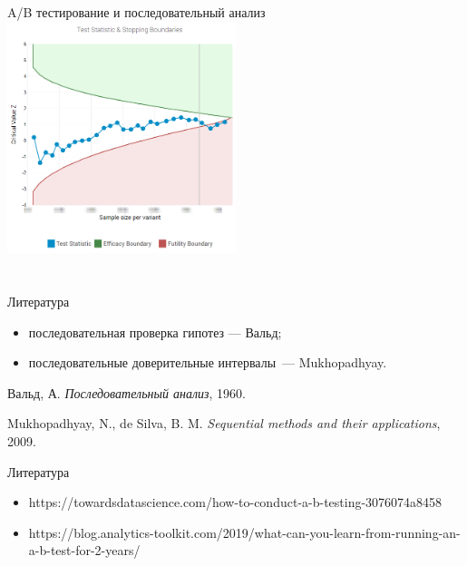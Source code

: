\documentclass[9pt,pdf,utf8,hyperref={unicode},aspectratio=169]{beamer}
\begin{document}
\begin{frame}{A/B тестирование и последовательный анализ}
\centering
\includegraphics[width=0.5\textwidth]{ab3.png}
\end{frame}



\section{}
\begin{frame}{Литература}
    \begin{itemize}
    \item последовательная проверка гипотез --- Вальд;
    \item последовательные доверительные интервалы~--- Mukhopadhyay.
    \end{itemize}
	
	\bigskip
	
    {\small
    Вальд, А. {\em Последовательный анализ}, 1960.
	
	\bigskip
	
    Mukhopadhyay, N., de Silva, B. M. {\em Sequential methods and their applications}, 2009.
%    
    }
\end{frame}

\begin{frame}{Литература}
    \begin{itemize}
    \item https://towardsdatascience.com/how-to-conduct-a-b-testing-3076074a8458
    \item https://blog.analytics-toolkit.com/2019/what-can-you-learn-from-running-an-a-b-test-for-2-years/

    \end{itemize}
\end{frame}
\end{document}
